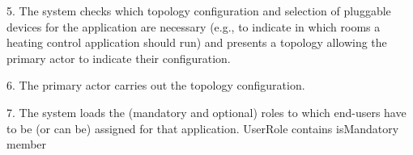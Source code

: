 {{{            5. The system checks which topology configuration and selection of pluggable devices for the application are necessary
               (e.g., to indicate in which rooms a heating control application should run)
               and presents a topology allowing the primary actor to indicate their configuration.

            6. The primary actor carries out the topology configuration.

            7. The system loads the (mandatory and optional) roles to which end-users have to be (or can be) assigned for that application.
                    UserRole contains isMandatory member

}}}
